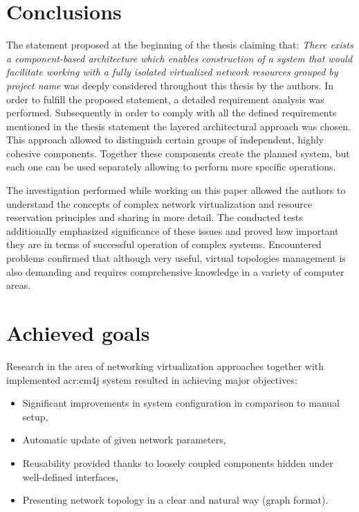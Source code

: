 \documentclass[11pt,openany]{book}
\begin{document}
    \section{Conclusions}
    \label{sub:sum:concl}

      The statement proposed at the beginning of the thesis claiming that: \emph{There exists a component-based
      architecture which enables construction of a system that would facilitate working with a fully isolated
      virtualized network resources grouped by project name} was deeply considered throughout this thesis by the
      authors. In order to fulfill the proposed statement, a detailed requirement analysis was performed. Subsequently
      in order to comply with all the defined requirements mentioned in the thesis statement the layered architectural
      approach was chosen. This approach allowed to distinguish certain groups of independent, highly cohesive
      components. Together these components create the planned system, but each one can be used separately allowing to
      perform more specific operations.

      The investigation performed while working on this paper allowed the authors to understand the concepts of complex
      network virtualization and resource reservation principles and sharing in more detail. The conducted tests
      additionally emphasized significance of these issues and proved how important they are in terms of successful
      operation of complex systems. Encountered problems confirmed that although very useful, virtual topologies
      management is also demanding and requires comprehensive knowledge in a variety of computer areas.


    \section{Achieved goals}
    \label{sub:sum:achieved}

      Research in the area of networking virtualization approaches together with implemented \gls{acr:cm4j} system
      resulted in achieving major objectives:

      \begin{itemize}
        \item Significant improvements in system configuration in comparison to manual setup,
        \item Automatic update of given network parameters,
        \item Reusability provided thanks to loosely coupled components hidden under well-defined interfaces,
        \item Presenting network topology in a clear and natural way (graph format).
      \end{itemize}
		
\end{document}
